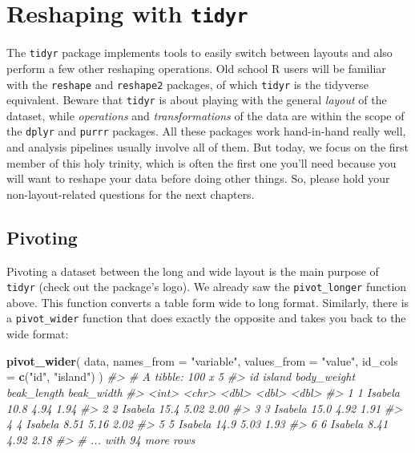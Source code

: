 \documentclass[]{book}
\newenvironment{Shaded}{}{}
\newcommand{\CommentTok}[1]{\textcolor[rgb]{0.38,0.63,0.69}{\textit{#1}}}
\newcommand{\DataTypeTok}[1]{\textcolor[rgb]{0.56,0.13,0.00}{#1}}
\newcommand{\KeywordTok}[1]{\textcolor[rgb]{0.00,0.44,0.13}{\textbf{#1}}}
\newcommand{\NormalTok}[1]{#1}
\newcommand{\StringTok}[1]{\textcolor[rgb]{0.25,0.44,0.63}{#1}}
\begin{document}
\hypertarget{reshaping-with-tidyr}{%
\section{\texorpdfstring{Reshaping with \texttt{tidyr}}{Reshaping with tidyr}}\label{reshaping-with-tidyr}}

The \texttt{tidyr} package implements tools to easily switch between layouts and also perform a few other reshaping operations. Old school R users will be familiar with the \texttt{reshape} and \texttt{reshape2} packages, of which \texttt{tidyr} is the tidyverse equivalent. Beware that \texttt{tidyr} is about playing with the general \emph{layout} of the dataset, while \emph{operations} and \emph{transformations} of the data are within the scope of the \texttt{dplyr} and \texttt{purrr} packages. All these packages work hand-in-hand really well, and analysis pipelines usually involve all of them. But today, we focus on the first member of this holy trinity, which is often the first one you'll need because you will want to reshape your data before doing other things. So, please hold your non-layout-related questions for the next chapters.

\hypertarget{pivoting}{%
\subsection{Pivoting}\label{pivoting}}

Pivoting a dataset between the long and wide layout is the main purpose of \texttt{tidyr} (check out the package's logo). We already saw the \texttt{pivot\_longer} function above. This function converts a table form wide to long format. Similarly, there is a \texttt{pivot\_wider} function that does exactly the opposite and takes you back to the wide format:

\begin{Shaded}
\begin{Highlighting}[]
\KeywordTok{pivot_wider}\NormalTok{(}
\NormalTok{  data, }
  \DataTypeTok{names_from =} \StringTok{"variable"}\NormalTok{, }
  \DataTypeTok{values_from =} \StringTok{"value"}\NormalTok{, }
  \DataTypeTok{id_cols =} \KeywordTok{c}\NormalTok{(}\StringTok{"id"}\NormalTok{, }\StringTok{"island"}\NormalTok{)}
\NormalTok{)}
\CommentTok{#> # A tibble: 100 x 5}
\CommentTok{#>      id island  body_weight beak_length beak_width}
\CommentTok{#>   <int> <chr>         <dbl>       <dbl>      <dbl>}
\CommentTok{#> 1     1 Isabela       10.8         4.94       1.94}
\CommentTok{#> 2     2 Isabela       15.4         5.02       2.00}
\CommentTok{#> 3     3 Isabela       15.0         4.92       1.91}
\CommentTok{#> 4     4 Isabela        8.51        5.16       2.02}
\CommentTok{#> 5     5 Isabela       14.9         5.03       1.93}
\CommentTok{#> 6     6 Isabela        8.41        4.92       2.18}
\CommentTok{#> # ... with 94 more rows}
\end{Highlighting}
\end{Shaded}
\end{document}
